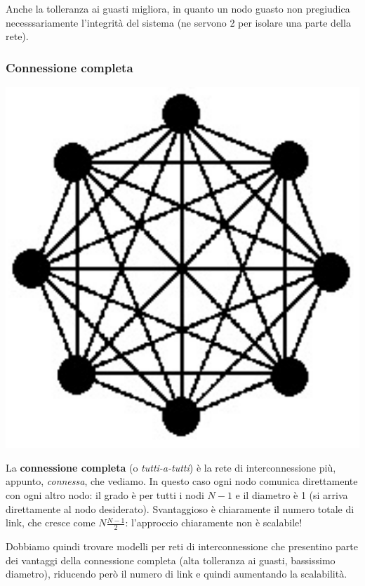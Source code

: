 \documentclass[a4paper,11pt]{article}
\begin{document}
Anche la tolleranza ai guasti migliora, in quanto un nodo guasto non pregiudica necesssariamente l'integrità del sistema (ne servono 2 per isolare una parte della rete).

\subsubsection{Connessione completa}
\begin{center}
	\includegraphics[scale=0.12]{../figures/full_conn.png}
\end{center}
La \textbf{connessione completa} (o \textit{tutti-a-tutti}) è la rete di interconnessione più, appunto, \textit{connessa}, che vediamo.
In questo caso ogni nodo comunica direttamente con ogni altro nodo: il grado è per tutti i nodi $N - 1$ e il diametro è 1 (si arriva direttamente al nodo desiderato).
Svantaggioso è chiaramente il numero totale di link, che cresce come $N \frac{N - 1}{2}$: l'approccio chiaramente non è scalabile!

Dobbiamo quindi trovare modelli per reti di interconnessione che presentino parte dei vantaggi della connessione completa (alta tolleranza ai guasti, bassissimo diametro), riducendo però il numero di link e quindi aumentando la scalabilità.
\end{document}
